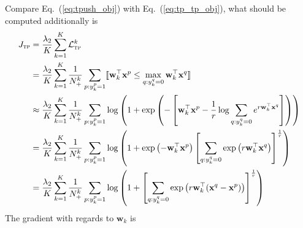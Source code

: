\documentclass[9pt]{extarticle}
\newcommand{\llb}{\llbracket}
\newcommand{\rrb}{\rrbracket}
\newcommand{\x}{\mathbf{x}}
\newcommand{\1}{\mathbf{1}}
\newcommand{\w}{\mathbf{w}}
\newcommand{\LCal}{\mathcal{L}}
\begin{document}
Compare Eq.~(\ref{eq:tpush_obj}) with Eq.~(\ref{eq:tp_tp_obj}), what should be computed additionally is
\begin{equation}
\label{eq:tp_tp_obj_p2}
\begin{aligned}
J_\textsc{tp} 
&= \frac{\lambda_2}{K} \sum_{k=1}^K \LCal_\textsc{tp}^k \\
&= \frac{\lambda_2}{K} \sum_{k=1}^K \frac{1}{N_+^k} \sum_{p:y_k^p=1} \llb \w_k^\top \x^p \le \max_{q:y_k^q=0} \w_k^\top \x^q \rrb \\
&\approx \frac{\lambda_2}{K} \sum_{k=1}^K \frac{1}{N_+^k} \sum_{p:y_k^p=1} 
         \log \left( 1 + \exp \left( -\left[ \w_k^\top \x^p - \frac{1}{r} \log \sum_{q:y_k^q=0} e^{r \w_k^\top \x^q} \right] \right) \right) \\
&= \frac{\lambda_2}{K} \sum_{k=1}^K \frac{1}{N_+^k} \sum_{p:y_k^p=1} 
   \log \left( 1 + \exp \left( -\w_k^\top \x^p \right) \left[ \sum_{q:y_k^q=0} \exp \left( r \w_k^\top \x^q \right) \right]^\frac{1}{r} \right) \\
&= \frac{\lambda_2}{K} \sum_{k=1}^K \frac{1}{N_+^k} \sum_{p:y_k^p=1} 
   \log \left( 1 + \left[ \sum_{q:y_k^q=0} \exp \left( r \w_k^\top (\x^q - \x^p) \right) \right]^\frac{1}{r} \right)
\end{aligned}
\end{equation}
The gradient with regards to $\w_k$ is
\end{document}
